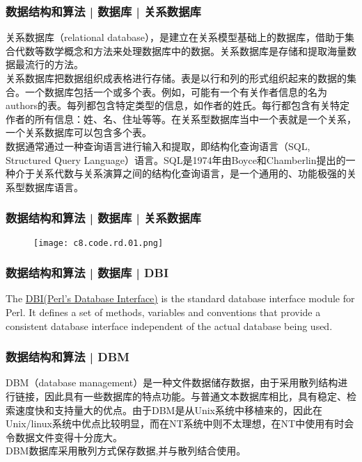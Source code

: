 \begin{frame}
  \frametitle{数据结构和算法 | 数据库 | 关系数据库}
关系数据库（relational database），是建立在关系模型基础上的数据库，借助于集合代数等数学概念和方法来处理数据库中的数据。\alert{关系数据库是存储和提取海量数据最流行的方法。}\\
\vspace{1em}
\alert{关系数据库把数据组织成表格进行存储。}表是以\alert{行和列的形式}组织起来的数据的集合。一个数据库包括一个或多个表。例如，可能有一个有关作者信息的名为authors的表。每列都包含特定类型的信息，如作者的姓氏。每行都包含有关特定作者的所有信息：姓、名、住址等等。在关系型数据库当中一个表就是一个关系，一个关系数据库可以包含多个表。\\
\vspace{1em}
数据通常通过一种查询语言进行输入和提取，即\alert{结构化查询语言（SQL, Structured Query Language）语言}。SQL是1974年由Boyce和Chamberlin提出的一种介于关系代数与关系演算之间的结构化查询语言，是一个通用的、功能极强的关系型数据库语言。
\end{frame}

\begin{frame}
  \frametitle{数据结构和算法 | 数据库 | 关系数据库}
  \begin{figure}
    \centering
    \texttt{[image: c8.code.rd.01.png]}
  \end{figure}
\end{frame}

\begin{frame}
  \frametitle{数据结构和算法 | 数据库 | DBI}
  The \href{http://dbi.perl.org/}{DBI(Perl's Database Interface)} is the standard database interface module for Perl. It defines a set of methods, variables and conventions that provide a consistent database interface independent of the actual database being used. 
\end{frame}

\begin{frame}
  \frametitle{数据结构和算法 | DBM}
  DBM（database management）是一种文件数据储存数据，由于采用散列结构进行链接，因此具有一些数据库的特点功能。与普通文本数据库相比，具有稳定、检索速度快和支持量大的优点。由于DBM是从Unix系统中移植来的，因此在Unix/linux系统中优点比较明显，而在NT系统中则不太理想，在NT中使用有时会令数据文件变得十分庞大。\\
  \vspace{1em}
  DBM数据库采用散列方式保存数据,并与散列结合使用。 
\end{frame}

